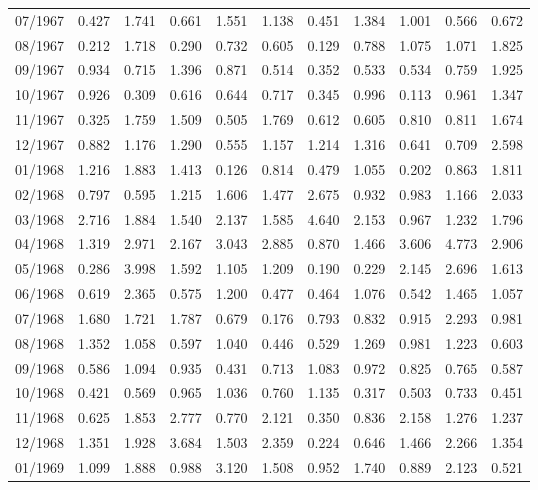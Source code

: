\begin{tabular}{lrrrrrrrrrr}
07/1967 &  0.427 &  1.741 &  0.661 &  1.551 &  1.138 &  0.451 &  1.384 &  1.001 &  0.566 &  0.672 \\
08/1967 &  0.212 &  1.718 &  0.290 &  0.732 &  0.605 &  0.129 &  0.788 &  1.075 &  1.071 &  1.825 \\
09/1967 &  0.934 &  0.715 &  1.396 &  0.871 &  0.514 &  0.352 &  0.533 &  0.534 &  0.759 &  1.925 \\
10/1967 &  0.926 &  0.309 &  0.616 &  0.644 &  0.717 &  0.345 &  0.996 &  0.113 &  0.961 &  1.347 \\
11/1967 &  0.325 &  1.759 &  1.509 &  0.505 &  1.769 &  0.612 &  0.605 &  0.810 &  0.811 &  1.674 \\
12/1967 &  0.882 &  1.176 &  1.290 &  0.555 &  1.157 &  1.214 &  1.316 &  0.641 &  0.709 &  2.598 \\
01/1968 &  1.216 &  1.883 &  1.413 &  0.126 &  0.814 &  0.479 &  1.055 &  0.202 &  0.863 &  1.811 \\
02/1968 &  0.797 &  0.595 &  1.215 &  1.606 &  1.477 &  2.675 &  0.932 &  0.983 &  1.166 &  2.033 \\
03/1968 &  2.716 &  1.884 &  1.540 &  2.137 &  1.585 &  4.640 &  2.153 &  0.967 &  1.232 &  1.796 \\
04/1968 &  1.319 &  2.971 &  2.167 &  3.043 &  2.885 &  0.870 &  1.466 &  3.606 &  4.773 &  2.906 \\
05/1968 &  0.286 &  3.998 &  1.592 &  1.105 &  1.209 &  0.190 &  0.229 &  2.145 &  2.696 &  1.613 \\
06/1968 &  0.619 &  2.365 &  0.575 &  1.200 &  0.477 &  0.464 &  1.076 &  0.542 &  1.465 &  1.057 \\
07/1968 &  1.680 &  1.721 &  1.787 &  0.679 &  0.176 &  0.793 &  0.832 &  0.915 &  2.293 &  0.981 \\
08/1968 &  1.352 &  1.058 &  0.597 &  1.040 &  0.446 &  0.529 &  1.269 &  0.981 &  1.223 &  0.603 \\
09/1968 &  0.586 &  1.094 &  0.935 &  0.431 &  0.713 &  1.083 &  0.972 &  0.825 &  0.765 &  0.587 \\
10/1968 &  0.421 &  0.569 &  0.965 &  1.036 &  0.760 &  1.135 &  0.317 &  0.503 &  0.733 &  0.451 \\
11/1968 &  0.625 &  1.853 &  2.777 &  0.770 &  2.121 &  0.350 &  0.836 &  2.158 &  1.276 &  1.237 \\
12/1968 &  1.351 &  1.928 &  3.684 &  1.503 &  2.359 &  0.224 &  0.646 &  1.466 &  2.266 &  1.354 \\
01/1969 &  1.099 &  1.888 &  0.988 &  3.120 &  1.508 &  0.952 &  1.740 &  0.889 &  2.123 &  0.521 \\

\end{tabular}
